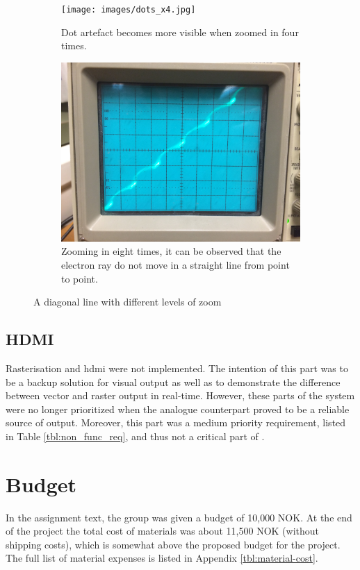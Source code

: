 \begin{figure}[h!]
	\ContinuedFloat
    \begin{subfigure}[b]{\textwidth}
		\centering
        \texttt{[image: images/dots\_x4.jpg]}
        \caption{Dot artefact becomes more visible when zoomed in four times.}
        \label{fig:dotx4}
    \end{subfigure}

    \begin{subfigure}[b]{\textwidth}
		\centering
        \includegraphics[height=0.4\textheight]{images/dots_x8.jpg}
        \caption{Zooming in eight times, it can be observed that the electron ray do not move in a straight line from point to point.}
        \label{fig:dotx8}
    \end{subfigure}
    \caption{A diagonal line with different levels of zoom}
    \label{fig:artefact-dots}
\end{figure}

\subsection{HDMI}
Rasterisation and \gls{hdmi} were not implemented.
The intention of this part was to be a backup solution for visual output as well as to demonstrate the difference between vector and raster output in real-time.
However, these parts of the system were no longer prioritized when the analogue counterpart proved to be a reliable source of output.
Moreover, this part was a medium priority requirement, listed in Table \ref{tbl:non_func_req}, and thus not a critical part of \vthreek.

\section{Budget}
In the assignment text, the group was given a budget of 10,000 NOK.
At the end of the project the total cost of materials was about 11,500 NOK (without shipping costs), which is somewhat above the proposed budget for the project.
The full list of material expenses is listed in Appendix \ref{tbl:material-cost}.

